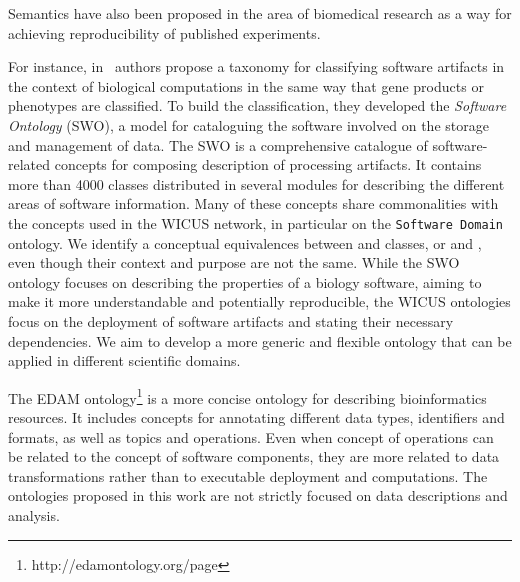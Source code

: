 Semantics have also been proposed in the area of biomedical research 
as a way for achieving reproducibility of published experiments. 

For instance, in~\cite{MaloneSWO2014} authors propose a taxonomy for 
classifying software artifacts in the context of biological computations in 
the same way that gene products or phenotypes are classified. To build the
classification, they developed the {\it Software Ontology} (SWO), a model 
for cataloguing the software involved on the storage and management of data.
The SWO is a comprehensive catalogue of software-related concepts for 
composing description of processing artifacts. It contains more than 4000 
classes distributed in several modules for describing the different areas of 
software information. Many of these concepts share commonalities with the 
concepts used in the WICUS network, in particular on the \texttt{Software 
Domain} ontology. We identify a conceptual equivalences between 
 and  classes, or 
 and , even though their 
context and purpose are not the same. While the SWO ontology focuses 
on describing the properties of a biology software, aiming to make it more 
understandable and potentially reproducible, the WICUS ontologies focus 
on the deployment of software artifacts and stating their necessary 
dependencies. We aim to develop a more generic and flexible ontology 
that can be applied in different scientific domains.

The EDAM ontology\footnote{http://edamontology.org/page} is a more 
concise ontology for describing bioinformatics resources. It includes concepts 
for annotating different data types, identifiers and formats, as well as topics 
and operations. Even when concept of operations can be related to the 
concept of software components, they are more related to data 
transformations rather than to executable deployment and computations.
The ontologies proposed in this work are not strictly focused on data 
descriptions and analysis.



